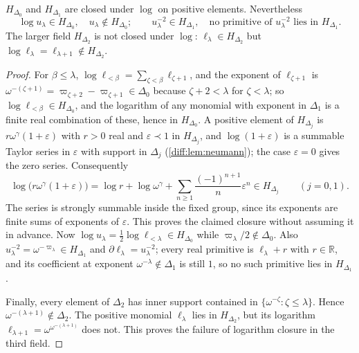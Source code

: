 \documentclass[11pt,letterpaper]{article}
\numberwithin{equation}{section}
\theoremstyle{definition}
\theoremstyle{remark}
\newcommand{\R}{\mathbb R}
\newcommand{\der}{\partial}
\begin{document}
\begin{proposition}
\label{diff:cp:prop:gaps}
$H_{\Delta_{0}}$ and $H_{\Delta_{1}}$ are closed under $\log$ on positive
elements. Nevertheless
\[
 \log u_{\lambda}\in H_{\Delta_{0}},\quad u_{\lambda}\notin H_{\Delta_{0}};
 \qquad
 u_{\lambda}^{-2}\in H_{\Delta_{1}},\quad
 \text{no primitive of }u_{\lambda}^{-2}\text{ lies in }H_{\Delta_{1}} .
\]
The larger field $H_{\Delta_2}$ is not closed under $\log$:
$\ell_\lambda\in H_{\Delta_2}$ but
$\log\ell_\lambda=\ell_{\lambda+1}\notin H_{\Delta_2}$.
\end{proposition}
\begin{proof}
For $\beta\leq\lambda$, $\log\ell_{<\beta}=\sum_{\zeta<\beta}\ell_{\zeta+1}$, and
the exponent of $\ell_{\zeta+1}$ is
$\omega^{-(\zeta+1)}=\varpi_{\zeta+2}-\varpi_{\zeta+1}\in\Delta_{0}$ because
$\zeta+2<\lambda$ for $\zeta<\lambda$; so $\log\ell_{<\beta}\in H_{\Delta_{0}}$,
and the logarithm of any monomial with exponent in $\Delta_{1}$ is a finite
real combination of these, hence in $H_{\Delta_{0}}$. A positive element of
$H_{\Delta_{j}}$ is $r\omega^{\gamma}(1+\varepsilon)$ with $r>0$ real and
$\varepsilon\prec1$ in $H_{\Delta_{j}}$, and $\log(1+\varepsilon)$ is a summable
Taylor series in $\varepsilon$ with support in $\Delta_{j}$
(\cref{diff:lem:neumann}); the case $\varepsilon=0$ gives the
zero series. Consequently
\[
 \log\bigl(r\omega^\gamma(1+\varepsilon)\bigr)
 =\log r+\log\omega^\gamma+
   \sum_{n\geq1}\frac{(-1)^{n+1}}{n}\varepsilon^n
 \in H_{\Delta_j}\qquad(j=0,1).
\]
The series is strongly summable inside the fixed group, since its
exponents are finite sums of exponents of $\varepsilon$.
This proves the claimed closure without assuming it in advance. Now $\log u_{\lambda}=\frac12\log\ell_{<\lambda}\in
H_{\Delta_{0}}$ while $\varpi_{\lambda}/2\notin\Delta_{0}$. Also
$u_{\lambda}^{-2}=\omega^{-\varpi_{\lambda}}\in H_{\Delta_{1}}$ and
$\der\ell_{\lambda}=u_{\lambda}^{-2}$; every real primitive is $\ell_{\lambda}+r$
with $r\in\R$, and its coefficient at exponent
$\omega^{-\lambda}\notin\Delta_1$ is still $1$, so no such
primitive lies in $H_{\Delta_1}$.

Finally, every element of $\Delta_2$ has inner support contained
in $\{\omega^{-\zeta}:\zeta\leq\lambda\}$. Hence
$\omega^{-(\lambda+1)}\notin\Delta_2$. The positive monomial
$\ell_\lambda$ lies in $H_{\Delta_2}$, but its logarithm
$\ell_{\lambda+1}=\omega^{\omega^{-(\lambda+1)}}$ does not.
This proves the failure of logarithm closure in the third field.
\end{proof}
\end{document}
